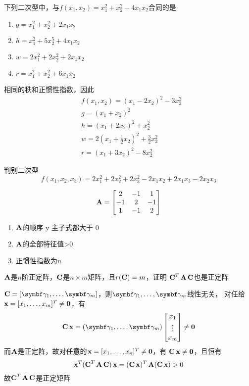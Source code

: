 \documentclass{article}
\begin{document}
\begin{examplle}[]
下列二次型中，与\(f(x_1,x_2)=x_1^2+x_2^2-4x_1x_2\)合同的是
\begin{enumerate}
\item \(g=x_1^2+x_2^2+2x_1x_2\)
\item \(h=x_1^2+5x_2^5+4x_1x_2\)
\item \(w=2x_1^2+2x_2^2+2x_1x_2\)
\item \(r=x_1^2+x_2^2+6x_1x_2\)
\end{enumerate}


相同的秩和正惯性指数，因此
\begin{align*}
&f(x_1,x_2)=(x_1-2x_2)^2-3x_2^2\\
&g=(x_1+x_2)^2\\
&h=(x_1+2x_2)^2+x_2^2\\
&w=2(x_1+\frac{1}{2}x_2)^2+\frac{3}{2}x_2^2\\
&r=(x_1+3x_2)^2-8x_2^2
\end{align*}
\end{examplle}

\begin{examplle}[]
判别二次型
\begin{equation*}
f(x_1,x_2,x_3)=2x_1^2+2x_2^2+2x_3^2-2x_1x_2+2x_1x_3-2x_2x_3
\end{equation*}

\begin{equation*}
\operatorname{\textbf{A}}=
\begin{bmatrix}
2&-1&1\\
-1&2&-1\\
1&-1&2
\end{bmatrix}
\end{equation*}

\begin{enumerate}
\item \(\operatorname{\textbf{A}}\)的顺序 y 主子式都大于 0
\item \(\operatorname{\textbf{A}}\)的全部特征值>0
\item 正惯性指数为\(n\)
\end{enumerate}
\end{examplle}

\begin{examplle}[]
\(\operatorname{\textbf{A}}\)是\(n\)阶正定阵，\(\operatorname{\textbf{C}}\)是\(n\times m\)矩阵，且\(r(\operatorname{\textbf{C}})=m\)，证明
\(\operatorname{\textbf{C}}^T\operatorname{\textbf{A}}\operatorname{\textbf{C}}\)也是正定阵

\(\bC=[\bgamma_1,\dots,\bgamma_m]\)，则\(\bgamma_1,\dots,\bgamma_m\)线性无关，
对任给\(\operatorname{\textbf{x}}=[x_1,\dots,x_m]^T\neq\mathbf{0}\)，有
\begin{equation*}
\bC\bx=(\bgamma_1,\dots,\bgamma_m)
\begin{bmatrix}
x_1\\\vdots\\x_m
\end{bmatrix}\neq\bzero
\end{equation*}
而\(\operatorname{\textbf{A}}\)是正定阵，故对任意的\(\operatorname{\textbf{x}}=[x_1,\dots,x_n]^T\neq\mathbf{0}\)，有
\(\operatorname{\textbf{C}}\operatorname{\textbf{x}}\neq\mathbf{0}\)，且恒有
\begin{equation*}
\operatorname{\textbf{x}}^T(\operatorname{\textbf{C}}^T\operatorname{\textbf{A}}\operatorname{\textbf{C}})\operatorname{\textbf{x}}=(\operatorname{\textbf{C}}\operatorname{\textbf{x}})^T\operatorname{\textbf{A}}(\operatorname{\textbf{C}}\operatorname{\textbf{x}})>0
\end{equation*}
故\(\operatorname{\textbf{C}}^T\operatorname{\textbf{A}}\operatorname{\textbf{C}}\)是正定矩阵
\end{examplle}
\end{document}
